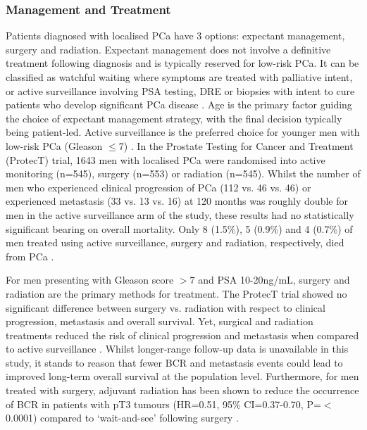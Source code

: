\subsubsection{Management and Treatment}
Patients diagnosed with localised PCa have 3 options: expectant management, surgery and radiation. Expectant management does not involve a definitive treatment following diagnosis and is typically reserved for low-risk PCa. It can be classified as watchful waiting where symptoms are treated with palliative intent, or active surveillance involving PSA testing, DRE or biopsies with intent to cure patients who develop significant PCa disease \cite{Filson2015Jul}. Age is the primary factor guiding the choice of expectant management strategy, with the final decision typically being patient-led. Active surveillance is the preferred choice for younger men with low-risk PCa (Gleason $\leq$7) \cite{Chen2016Jun}. In the Prostate Testing for Cancer and Treatment (ProtecT) trial, 1643 men with localised PCa were randomised into active monitoring (n=545), surgery (n=553) or radiation (n=545). Whilst the number of men who experienced clinical progression of PCa (112 vs. 46 vs. 46) or experienced metastasis (33 vs. 13 vs. 16) at 120 months was roughly double for men in the active surveillance arm of the study, these results had no statistically significant bearing on overall mortality. Only 8 (1.5\%), 5 (0.9\%) and 4 (0.7\%) of men treated using active surveillance, surgery and radiation, respectively, died from PCa \cite{Hamdy2016Oct, Donovan2016Oct}. \par
For men presenting with Gleason score $>$7 and PSA 10-20ng/mL, surgery and radiation are the primary methods for treatment. The ProtecT trial showed no significant difference between surgery vs. radiation with respect to clinical progression, metastasis and overall survival. Yet, surgical and radiation treatments reduced the risk of clinical progression and metastasis when compared to active surveillance \cite{Hamdy2016Oct, Donovan2016Oct}. Whilst longer-range follow-up data is unavailable in this study, it stands to reason that fewer BCR and metastasis events could lead to improved long-term overall survival at the population level. Furthermore, for men treated with surgery, adjuvant radiation has been shown to reduce the occurrence of BCR in patients with pT3 tumours (HR=0.51, 95\% CI=0.37-0.70, P=$<$0.0001) compared to `wait-and-see' following surgery \cite{Wiegel2014Aug}. \par
